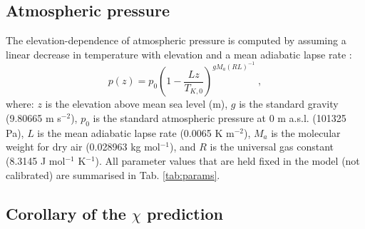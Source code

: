 \documentclass{myreport}
\begin{document}
\subsection{Atmospheric pressure}
\label{sec:press}
The elevation-dependence of atmospheric pressure is computed by assuming a linear decrease in temperature with elevation and a mean adiabatic lapse rate \citep{berberan97}:
\begin{equation}
\label{eq:pz}
    p(z) = p_0 \left( 
    	1 - \frac{L z}{T_{K,0}} 
    \right)^{g M_a (R L)^{-1}} \;,
\end{equation} 
where: $z$ is the elevation above mean sea level (m), $g$ is the standard gravity (9.80665 m s$^{-2}$), $p_0$ is the standard atmospheric pressure at 0 m a.s.l. (101325 Pa), $L$ is the mean adiabatic lapse rate (0.0065 K m$^{-2}$), $M_a$ is the molecular weight for dry air (0.028963 kg mol$^{-1}$), and $R$ is the universal gas constant (8.3145 J mol$^{-1}$ K$^{-1}$). All parameter values that are held fixed in the model (not calibrated) are summarised in Tab. \ref{tab:params}.

\subsection{Corollary of the $\chi$ prediction}
\label{sec:corollary}
\end{document}
